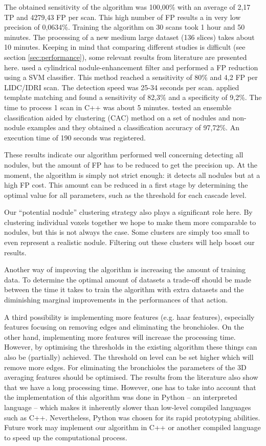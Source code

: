 The obtained sensitivity of the algorithm was 100,00\% with an average of 2,17
TP and 4279,43 FP per scan. This high number of FP results a in very low
precision of 0,0634\%. Training the algorithm on 30 scans took 1 hour and 50
minutes. The processing of a new medium large dataset (136 slices) takes about
10 minutes.
Keeping in mind that comparing different studies is difficult (see section
\ref{sec:performance}), some relevant results from literature are presented
here. \cite{teramoto} used a cylindrical nodule-enhancement filter and performed
a FP reduction using a SVM classifier. This method reached a sensitivity of 80\%
and 4,2 FP per LIDC/IDRI scan. The detection speed was 25-34 seconds per scan.
\cite{elbaz} applied template matching and found a sensitivity of 82,3\% and a
specificity of 9,2\%. The time to process 1 scan in C++ was about 5 minutes.
\cite{lee2010} tested an ensemble classification aided by clustering (CAC)
method on a set of nodules and non-nodule examples and they obtained a
classification accuracy of 97,72\%. An execution time of 190 seconds was
registered.

These results indicate our algorithm performed well concerning detecting all
nodules, but the amount of FP has to be reduced to get the precision up. At the
moment, the algorithm is simply not strict enough: it detects all nodules but at
a high FP cost. This amount can be reduced in a first stage by determining
the optimal value for all parameters, such as the threshold for each cascade
level.

Our ``potential nodule'' clustering strategy also plays a significant role here.
By clustering individual voxels together we hope to make them more comparable
to nodules, but this is not always the case. Some clusters are simply too small
to even represent a realistic nodule. Filtering out these clusters will help
boost our results.

Another way of improving the algorithm is increasing the amount of training
data. To determine the optimal amount of datasets a trade-off should be made
between the time it takes to train the algorithm with extra datasets and the
diminishing marginal improvements in the performances of that action. 

A third possibility is implementing more features (e.g. haar features),
especially features focusing on removing edges and eliminating the bronchioles.
On the other hand, implementing more features will increase the processing time.
However, by optimising the thresholds in the existing algorithm these things can
also be (partially) achieved. The threshold on level can be set higher which
will remove more edges. For eliminating the bronchioles the parameters of the 3D
averaging features should be optimised. The results from the literature also
show that we have a long processing time. However, one has to take into account
that the implementation of this algorithm was done in Python -- an interpreted
language -- which makes it inherently slower than low-level compiled languages
such as C++. Nevertheless, Python was chosen for its rapid prototyping
abilities. Future work may implement our algorithm in C++ or another compiled
language to speed up the computational process.

